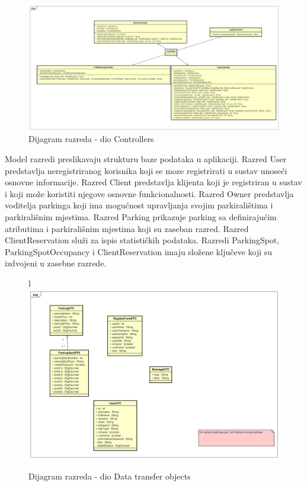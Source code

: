 \begin{figure}[H]
	
	\includegraphics[width=\textwidth]{slike/controller.jpeg} %
	\centering
	\caption{Dijagram razreda - dio Controllers}
	\label{fig:controllers}
\end{figure}

Model razredi preslikavaju strukturu baze podataka u aplikaciji. Razred User predstavlja neregistriranog korisnika koji se moze registrirati u sustav unoseći osnovne informacije. Razred Client predstavlja klijenta koji je registriran u sustav i koji može koristiti njegove osnovne funkcionalnosti. Razred Owner predstavlja voditelja parkinga koji ima mogućnost upravljanja svojim parkiralištima i parkirališnim mjestima. Razred Parking prikazuje parking sa definirajućim atributima i parkirališnim mjestima koji su zaseban razred. Razred ClientReservation služi za ispis statističkih podataka. Razredi ParkingSpot, ParkingSpotOccupancy i ClientReservation imaju složene ključeve koji su izdvojeni u zasebne razrede.

\begin{figure}[H]
	
l	\includegraphics[width=\textwidth]{slike/ClassDiagramDTO.png} %
	\centering
	\caption{Dijagram razreda - dio Data transfer objects}
	\label{fig:dto}
\end{figure}

